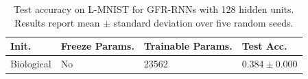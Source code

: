 \begin{table}[htp]
    \caption{Test accuracy on L-MNIST for GFR-RNNs with 128 hidden units. Results report mean $\pm$ standard deviation over five random seeds.}
    \label{tab:bio-lmnist-reproduced}
    \centering
    \begin{tabular}{llll}
    \toprule
    \textbf{Init.} & \textbf{Freeze Params.} & \textbf{Trainable Params.} & \textbf{Test Acc.} \\
    \midrule
    Biological & No & 23562 & $0.384 \pm 0.000$ \\
    \bottomrule
    \end{tabular}
\end{table}
